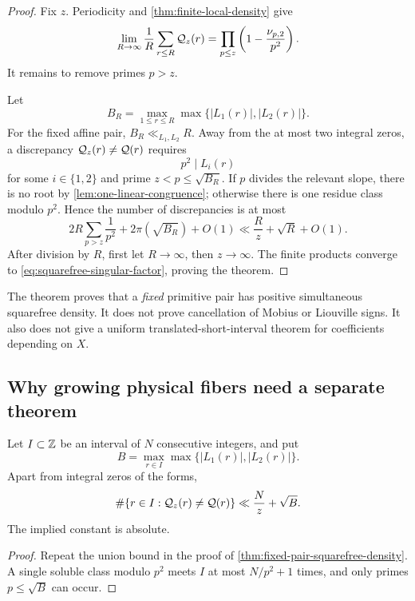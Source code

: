 \begin{proof}
Fix \(z\).  Periodicity and
\cref{thm:finite-local-density} give
\[
 \lim_{R\to\infty}
 \frac1R\sum_{r\le R}\mathcal Q_z(r)
 =
 \prod_{p\le z}
 \left(1-\frac{\nu_{p,2}}{p^2}\right).
\]
It remains to remove primes \(p>z\).

Let
\[
 B_R=\max_{1\le r\le R}
 \max\{|L_1(r)|,|L_2(r)|\}.
\]
For the fixed affine pair, \(B_R\ll_{L_1,L_2}R\).  Away from the at
most two integral zeros, a discrepancy
\(\mathcal Q_z(r)\ne\mathcal Q(r)\) requires
\[
 p^2\mid L_i(r)
\]
for some \(i\in\{1,2\}\) and prime
\(z<p\le\sqrt{B_R}\).  If \(p\) divides the relevant slope, there is
no root by \cref{lem:one-linear-congruence}; otherwise there is one
residue class modulo \(p^2\).  Hence the number of discrepancies is
at most
\[
 2R\sum_{p>z}\frac1{p^2}
 +2\pi(\sqrt{B_R})+O(1)
 \ll
 \frac{R}{z}+\sqrt R+O(1).
\]
After division by \(R\), first let \(R\to\infty\), then
\(z\to\infty\).  The finite products converge to
\eqref{eq:squarefree-singular-factor}, proving the theorem.
\end{proof}

\begin{remark}
\label{rem:density-scope}
The theorem proves that a \emph{fixed} primitive pair has positive
simultaneous squarefree density.  It does not prove cancellation of
Mobius or Liouville signs.  It also does not give a uniform
translated-short-interval theorem for coefficients depending on
\(X\).
\end{remark}

\subsection{Why growing physical fibers need a separate theorem}

\begin{proposition}
\label{prop:finite-interval-tail}
Let \(I\subset\mathbb Z\) be an interval of \(N\) consecutive integers, and
put
\[
 B=\max_{r\in I}\max\{|L_1(r)|,|L_2(r)|\}.
\]
Apart from integral zeros of the forms,
\begin{equation}
 \#\{r\in I:\mathcal Q_z(r)\ne\mathcal Q(r)\}
 \ll
 \frac{N}{z}+\sqrt B.
\label{eq:finite-interval-tail}
\end{equation}
The implied constant is absolute.
\end{proposition}

\begin{proof}
Repeat the union bound in the proof of
\cref{thm:fixed-pair-squarefree-density}.  A single soluble class
modulo \(p^2\) meets \(I\) at most \(N/p^2+1\) times, and only primes
\(p\le\sqrt B\) can occur.
\end{proof}

